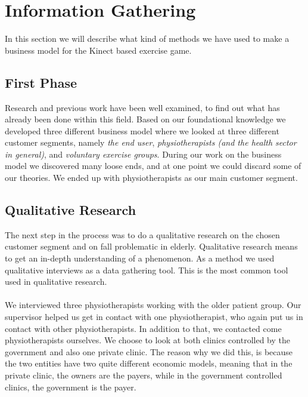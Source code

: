 \chapter{Information Gathering}

In this section we will describe what kind of methods we have used to make a business model for the Kinect based exercise game. 

\section{First Phase}
Research and previous work have been well examined, to find out what has already been done within this field. Based on our foundational knowledge we developed three different business model where we looked at three different customer segments, namely \emph{the end user}, \emph{physiotherapists (and the health sector in general)}, and \emph{voluntary exercise groups}. During our work on the business model we discovered many loose ends, and at one point we could discard some of our theories. We ended up with physiotherapists as our main customer segment.

\section{Qualitative Research}
The next step in the process was to do a qualitative research on the chosen customer segment and on fall problematic in elderly. Qualitative research means to get an in-depth understanding of a phenomenon. As a method we used qualitative interviews as a data gathering tool. This is the most common tool used in qualitative research.  \cite{interview2} \\ \\
We interviewed three physiotherapists working with the older patient group. Our supervisor helped us get in contact with one physiotherapist, who again put us in contact with other physiotherapists. In addition to that, we contacted come physiotherapists ourselves. We choose to look at both clinics controlled by the government and also one private clinic. The reason why we did this, is because the two entities have two quite different economic models, meaning that in the private clinic, the owners are the payers, while in the government controlled clinics, the government is the payer. 


